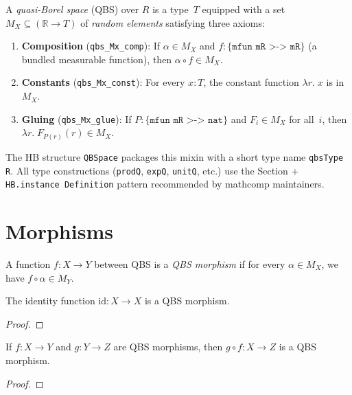 \begin{definition}\label{def:isQBS}
  \rocqok
  A \emph{quasi-Borel space} (QBS) over $R$ is a type~$T$ equipped with
  a set $M_X \subseteq (\mathbb{R} \to T)$ of \emph{random elements}
  satisfying three axioms:
  \begin{enumerate}
    \item \textbf{Composition} (\texttt{qbs\_Mx\_comp}):
      If $\alpha \in M_X$ and $f : \texttt{\{mfun mR >-> mR\}}$
      (a bundled measurable function), then
      $\alpha \circ f \in M_X$.
    \item \textbf{Constants} (\texttt{qbs\_Mx\_const}):
      For every $x : T$, the constant function
      $\lambda r.\; x$ is in $M_X$.
    \item \textbf{Gluing} (\texttt{qbs\_Mx\_glue}):
      If $P : \texttt{\{mfun mR >-> nat\}}$ and
      $F_i \in M_X$ for all~$i$, then
      $\lambda r.\; F_{P(r)}(r) \in M_X$.
  \end{enumerate}
  The HB structure \texttt{QBSpace} packages this mixin with a short
  type name \texttt{qbsType R}. All type constructions
  (\texttt{prodQ}, \texttt{expQ}, \texttt{unitQ}, etc.) use the
  Section + \texttt{HB.instance Definition} pattern recommended by
  mathcomp maintainers.
\end{definition}


\section{Morphisms}\label{sec:morphisms}

\begin{definition}\label{def:qbs_morphism}
  \rocqok
  A function $f : X \to Y$ between QBS is a \emph{QBS morphism} if for
  every $\alpha \in M_X$, we have $f \circ \alpha \in M_Y$.
\end{definition}

\begin{lemma}\label{lem:qbs_morphism_id}
  \rocqok
  The identity function $\mathrm{id} : X \to X$ is a QBS morphism.
\end{lemma}
\begin{proof}\rocqok\end{proof}

\begin{lemma}\label{lem:qbs_morphism_comp}
  \rocqok
  If $f : X \to Y$ and $g : Y \to Z$ are QBS morphisms, then
  $g \circ f : X \to Z$ is a QBS morphism.
\end{lemma}
\begin{proof}\rocqok\end{proof}

